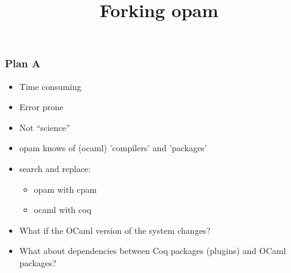 \documentclass[9pt]{beamer}
\begin{document}

\begin{frame}
  \frametitle{Plan A}
  \begin{itemize}
  \item Time consuming
  \item Error prone
  \item Not ``science''
  \end{itemize}
\end{frame}


\begin{frame}
  \title{Forking opam}
  \begin{itemize}
  \item opam knows of (ocaml) \alert{'compilers'} and 'packages'
    \pause
  \item search and replace:
    \begin{itemize}
    \item opam with cpam
    \item ocaml with coq
    \end{itemize}
    \pause
  \item What if the OCaml version of the system changes?
  \item What about dependencies between Coq packages (plugins) and OCaml  packages?
  \end{itemize}
\end{frame}


\end{document}

